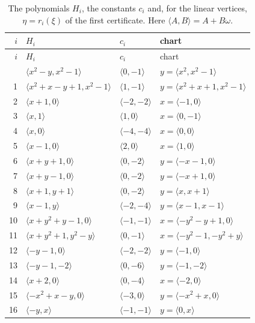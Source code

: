 \documentclass[11pt]{article}
\begin{document}
\begin{longtable}{@{}rlll@{}}
\caption{The polynomials $H_i$, the constants $c_i$ and, for the linear vertices, $\eta=r_i(\xi)$ of the first certificate. Here $\langle A,B\rangle=A+B\omega$.}\label{tab:vert1}\\
\hline $i$ & $H_i$ & $c_i$ & chart\\\hline\endfirsthead\hline $i$ & $H_i$ & $c_i$ & chart\\\hline\endhead\hline\endfoot
0 & $\langle x^{2}-y,x^{2}-1\rangle$ & $\langle 0,-1\rangle$ & $y=\langle x^{2},x^{2}-1\rangle$\\
1 & $\langle x^{2}+x-y+1,x^{2}-1\rangle$ & $\langle 1,-1\rangle$ & $y=\langle x^{2}+x+1,x^{2}-1\rangle$\\
2 & $\langle x+1,0\rangle$ & $\langle -2,-2\rangle$ & $x=\langle -1,0\rangle$\\
3 & $\langle x,1\rangle$ & $\langle 1,0\rangle$ & $x=\langle 0,-1\rangle$\\
4 & $\langle x,0\rangle$ & $\langle -4,-4\rangle$ & $x=\langle 0,0\rangle$\\
5 & $\langle x-1,0\rangle$ & $\langle 2,0\rangle$ & $x=\langle 1,0\rangle$\\
6 & $\langle x+y+1,0\rangle$ & $\langle 0,-2\rangle$ & $y=\langle -x-1,0\rangle$\\
7 & $\langle x+y-1,0\rangle$ & $\langle 0,-2\rangle$ & $y=\langle -x+1,0\rangle$\\
8 & $\langle x+1,y+1\rangle$ & $\langle 0,-2\rangle$ & $y=\langle x,x+1\rangle$\\
9 & $\langle x-1,y\rangle$ & $\langle -2,-4\rangle$ & $y=\langle x-1,x-1\rangle$\\
10 & $\langle x+y^{2}+y-1,0\rangle$ & $\langle -1,-1\rangle$ & $x=\langle -y^{2}-y+1,0\rangle$\\
11 & $\langle x+y^{2}+1,y^{2}-y\rangle$ & $\langle 0,-1\rangle$ & $x=\langle -y^{2}-1,-y^{2}+y\rangle$\\
12 & $\langle -y-1,0\rangle$ & $\langle -2,-2\rangle$ & $y=\langle -1,0\rangle$\\
13 & $\langle -y-1,-2\rangle$ & $\langle 0,-6\rangle$ & $y=\langle -1,-2\rangle$\\
14 & $\langle x+2,0\rangle$ & $\langle 0,-4\rangle$ & $x=\langle -2,0\rangle$\\
15 & $\langle -x^{2}+x-y,0\rangle$ & $\langle -3,0\rangle$ & $y=\langle -x^{2}+x,0\rangle$\\
16 & $\langle -y,x\rangle$ & $\langle -1,-1\rangle$ & $y=\langle 0,x\rangle$\\

\end{longtable}
\end{document}

